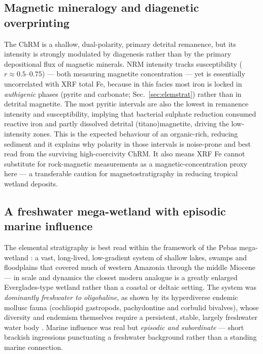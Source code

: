 \documentclass[11pt]{article}
\begin{document}
\subsection{Magnetic mineralogy and diagenetic overprinting}
The ChRM is a shallow, dual-polarity, primary detrital remanence, but its
intensity is strongly modulated by diagenesis rather than by the primary
depositional flux of magnetic minerals. NRM intensity tracks susceptibility
($r\approx0.5$--$0.75$) --- both measuring magnetite concentration --- yet is
essentially uncorrelated with XRF total Fe, because in this facies most iron is
locked in \emph{authigenic} phases (pyrite and carbonate; Sec.~\ref{sec:elemstrat})
rather than in detrital magnetite. The most pyritic intervals are also the
lowest in remanence intensity and susceptibility, implying that bacterial
sulphate reduction consumed reactive iron and partly dissolved detrital
(titano)magnetite, driving the low-intensity zones. This is the expected
behaviour of an organic-rich, reducing sediment and it explains why polarity in
those intervals is noise-prone and best read from the surviving high-coercivity
ChRM. It also means XRF Fe cannot substitute for rock-magnetic measurements as a
magnetic-concentration proxy here --- a transferable caution for magnetostratigraphy
in reducing tropical wetland deposits.

\subsection{A freshwater mega-wetland with episodic marine influence}
The elemental stratigraphy is best read within the framework of the Pebas
mega-wetland \citep{Hoorn2010,Wesselingh2006}: a vast, long-lived, low-gradient
system of shallow lakes, swamps and floodplains that covered much of western
Amazonia through the middle Miocene --- in scale and dynamics the closest
modern analogue is a greatly enlarged Everglades-type wetland rather than a
coastal or deltaic setting. The system was \emph{dominantly freshwater to
oligohaline}, as shown by its hyperdiverse endemic mollusc fauna (cochliopid
gastropods, pachydontine and corbulid bivalves), whose diversity and endemism
themselves require a persistent, stable, largely freshwater water body
\citep{Wesselingh2006}. Marine influence was real but \emph{episodic and
subordinate} --- short brackish ingressions punctuating a freshwater background
rather than a standing marine connection.
\end{document}
